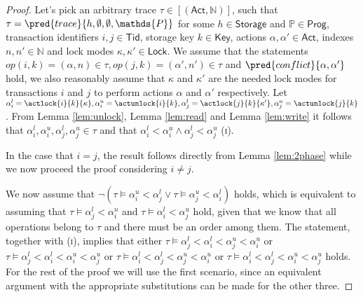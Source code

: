 \begin{proof}
Let's pick an arbitrary trace $\tau \in [(\mathsf{Act}, \mathds{N})]$, such that $\tau = \pred{trace}{h, \emptyset, \emptyset, \mathds{P}}$ for some $h \in \mathsf{Storage}$ and $\mathds{P} \in \mathsf{Prog}$, transaction identifiers $i, j \in \mathsf{Tid}$, storage key $k \in \mathsf{Key}$, actions $\alpha, \alpha' \in \mathsf{Act}$, indexes $n, n' \in \mathds{N}$ and lock modes $\kappa, \kappa' \in \mathsf{Lock}$. We assume that the statements $op(i, k) = (\alpha, n) \in \tau, op(j, k) = (\alpha', n') \in \tau$ and $\pred{conflict}{\alpha, \alpha'}$ hold, we also reasonably assume that $\kappa$ and $\kappa'$ are the needed lock modes for transactions $i$ and $j$ to perform actions $\alpha$ and $\alpha'$ respectively. Let $\alpha_i^l = \actlock{i}{k}{\kappa}, \alpha_i^u = \actunlock{i}{k}, \alpha_j^l = \actlock{j}{k}{\kappa'}, \alpha_j^u = \actunlock{j}{k}$. From Lemma \ref{lem:unlock}, Lemma \ref{lem:read} and Lemma \ref{lem:write} it follows that $\alpha_i^l, \alpha_i^u, \alpha_j^l, \alpha_j^u \in \tau$ and that $\alpha_i^l < \alpha_i^u \land \alpha_j^l < \alpha_j^u$ (\textsc{i}).

In the case that $i = j$, the result follows directly from Lemma \ref{lem:2phase} while we now proceed the proof considering $i \neq j$.

We now assume that $\lnot \left( \tau \vDash \alpha_i^u < \alpha_j^l  \lor \tau \vDash \alpha_j^u < \alpha_i^l \right)$ holds, which is equivalent to assuming that $\tau \vDash \alpha_j^l < \alpha_i^u$ and $\tau \vDash \alpha_i^l < \alpha_j^u$ hold, given that we know that all operations belong to $\tau$ and there must be an order among them. The statement, together with (\textsc{i}), implies that either $\tau \vDash \alpha_j^l < \alpha_i^l < \alpha_j^u < \alpha_i^u$ or $\tau \vDash \alpha_j^l < \alpha_i^l < \alpha_i^u < \alpha_j^u$ or $\tau \vDash \alpha_i^l < \alpha_j^l < \alpha_j^u < \alpha_i^u$ or $\tau \vDash \alpha_i^l < \alpha_j^l < \alpha_i^u < \alpha_j^u$ holds. For the rest of the proof we will use the first scenario, since an equivalent argument with the appropriate substitutions can be made for the other three.


\end{proof}
